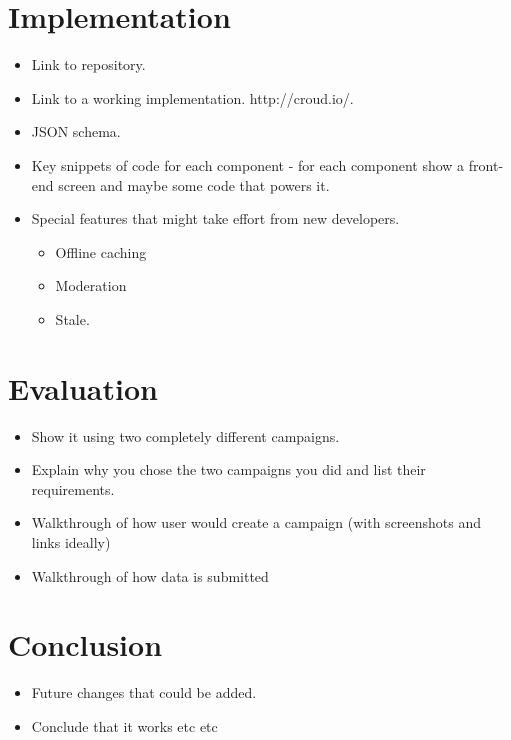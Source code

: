 \documentclass{article}
\let\oldsection\section
\renewcommand\section{\clearpage\oldsection}
\begin{document}
	\section{Implementation}
	\label{sec:implementation}
		\begin{itemize}
			\item Link to repository.
			\item Link to a working implementation. http://croud.io/.
			\item JSON schema.
			\item Key snippets of code for each component - for each component show a front-end screen and maybe some code that powers it.
			\item Special features that might take effort from new developers.
			\begin{itemize}
				\item Offline caching
				\item Moderation
				\item Stale.
			\end{itemize}
		\end{itemize}

	\section{Evaluation}
	\label{sec:evaluation}
		\begin{itemize}
			\item Show it using two completely different campaigns.
			\item Explain why you chose the two campaigns you did and list their requirements.
			\item Walkthrough of how user would create a campaign (with screenshots and links ideally)
			\item Walkthrough of how data is submitted
		\end{itemize}
	\section{Conclusion}
	\label{sec:conclusion}
		\begin{itemize}
			\item Future changes that could be added.
			\item Conclude that it works etc etc
		\end{itemize}

	
	
\end{document}

